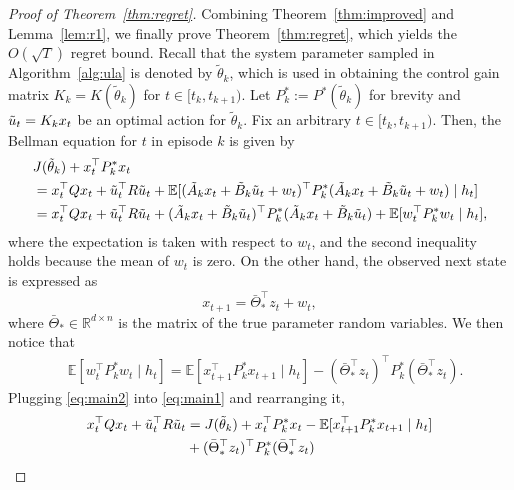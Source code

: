 \documentclass[11pt]{article}
\theoremstyle{plain}
\theoremstyle{definition}
\theoremstyle{remark}
\begin{document}
\begin{proof}[Proof of Theorem~\ref{thm:regret}]
Combining Theorem~\ref{thm:improved} and Lemma~\ref{lem:r1}, we finally prove Theorem~\ref{thm:regret}, which yields the $O(\sqrt{T})$ regret bound. Recall that the system parameter sampled in Algorithm~\ref{alg:ula} is denoted by $\tilde{\theta}_k$, which is used in obtaining the control gain matrix $K_k = K(\tilde{\theta}_k)$ for $t \in [t_k,t_{k+1})$. Let $P^*_k := P^* (\tilde{\theta}_k)$ for brevity and $\Tilde{u}_t = K_k x_t$ be an optimal action for $\tilde{\theta}_k$. Fix an arbitrary $t \in [t_k, t_{k+1})$. Then, the Bellman equation {\cite{bertsekas2011dynamic}} for $t$ in episode $k$ is given by
\begin{equation}\label{eq:main1}
\begin{split}
&J(\tilde{\theta}_k) + x_t^\top P^*_k x_t\\
 &= 
x_t^{\top} Q x_t + \Tilde{u}_t^{\top} R \Tilde{u}_t + \mathbb{E} [ (\tilde{A}_kx_t+\Tilde{B}_k\Tilde{u}_t+ w_t)^\top P^*_k (\tilde{A}_kx_t+\Tilde{B}_k\Tilde{u}_t + w_t) \mid h_t]\\
&= x_t^{\top} Qx_t + \Tilde{u}_t^{\top}R \Tilde{u}_t +  (\tilde{A}_kx_t+\Tilde{B}_k\Tilde{u}_t )^\top P^*_k(\tilde{A}_kx_t+\Tilde{B}_k\Tilde{u}_t) + \mathbb{E} [ w_t^\top P^*_k w_t \mid h_t],
\end{split}
\end{equation}
where the expectation is taken with respect to $w_t$, and
the second inequality holds because the mean of $w_t$ is zero.
On the other hand, the observed next state is expressed as
\[
x_{t+1} = \bar{\Theta}_*^\top z_t + w_t,
\]
where $\bar{\Theta}_* \in \mathbb{R}^{d \times n}$ is the matrix of the true parameter random variables. 
We then notice that
\begin{equation}\label{eq:main2}
\begin{split}
&\mathbb{E} [ w_t^\top P^*_k w_t \mid h_t]=\mathbb{E} [ x_{t+1}^\top P^*_k x_{t+1} \mid h_t] - 
(\bar{\Theta}_*^\top z_t )^\top P^*_k (\bar{\Theta}_*^\top z_t ).
\end{split}
\end{equation}
Plugging \eqref{eq:main2} into \eqref{eq:main1} and rearranging it,
\begin{equation}\label{eq:main3}
\begin{split}
x_t^{\top} Q x_t + \Tilde{u}_t^{\top} R \Tilde{u}_t  &= J(\tilde{\theta}_k) + x_t^\top P^*_k x_t 
-\mathbb{E} [ x_{t+1}^\top P^*_k x_{t+1} \mid h_t]\\
&+ (\bar{\Theta}_*^\top z_t )^\top P^*_k (\bar{\Theta}_*^\top z_t )

\end{split}
\end{equation}
\end{proof}
\end{document}
